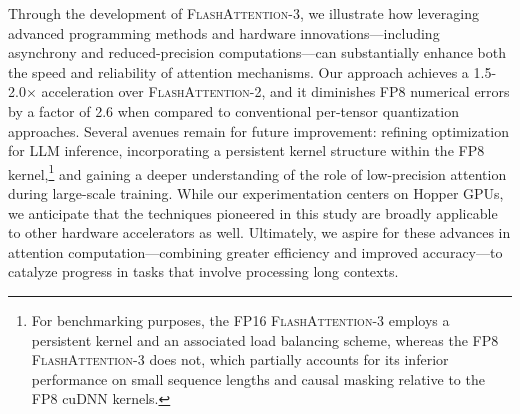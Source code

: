 Through the development of \textsc{FlashAttention-3}, we illustrate how leveraging advanced programming methods and hardware innovations—including asynchrony and reduced-precision computations—can substantially enhance both the speed and reliability of attention mechanisms. Our approach achieves a 1.5-2.0$\times$ acceleration over \textsc{FlashAttention-2}, and it diminishes FP8 numerical errors by a factor of 2.6 when compared to conventional per-tensor quantization approaches. Several avenues remain for future improvement: refining optimization for LLM inference, incorporating a persistent kernel structure within the FP8 kernel,\footnote{For benchmarking purposes, the FP16 \textsc{FlashAttention-3} employs a persistent kernel and an associated load balancing scheme, whereas the FP8 \textsc{FlashAttention-3} does not, which partially accounts for its inferior performance on small sequence lengths and causal masking relative to the FP8 cuDNN kernels.} and gaining a deeper understanding of the role of low-precision attention during large-scale training. While our experimentation centers on Hopper GPUs, we anticipate that the techniques pioneered in this study are broadly applicable to other hardware accelerators as well. Ultimately, we aspire for these advances in attention computation—combining greater efficiency and improved accuracy—to catalyze progress in tasks that involve processing long contexts.

